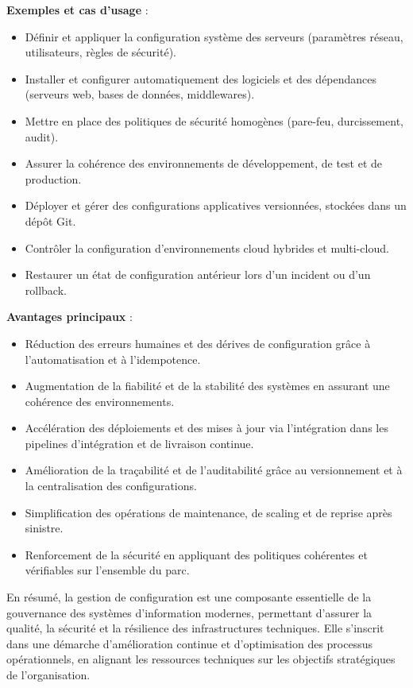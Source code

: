 \textbf{Exemples et cas d’usage} :
\begin{itemize}
	\item Définir et appliquer la configuration système des serveurs (paramètres réseau, utilisateurs, règles de sécurité).
	\item Installer et configurer automatiquement des logiciels et des dépendances (serveurs web, bases de données, middlewares).
	\item Mettre en place des politiques de sécurité homogènes (pare-feu, durcissement, audit).
	\item Assurer la cohérence des environnements de développement, de test et de production.
	\item Déployer et gérer des configurations applicatives versionnées, stockées dans un dépôt Git.
	\item Contrôler la configuration d’environnements cloud hybrides et multi-cloud.
	\item Restaurer un état de configuration antérieur lors d’un incident ou d’un rollback.
\end{itemize}

\textbf{Avantages principaux} :
\begin{itemize}
	\item Réduction des erreurs humaines et des dérives de configuration grâce à l’automatisation et à l’idempotence.
	\item Augmentation de la fiabilité et de la stabilité des systèmes en assurant une cohérence des environnements.
	\item Accélération des déploiements et des mises à jour via l’intégration dans les pipelines d’intégration et de livraison continue.
	\item Amélioration de la traçabilité et de l’auditabilité grâce au versionnement et à la centralisation des configurations.
	\item Simplification des opérations de maintenance, de scaling et de reprise après sinistre.
	\item Renforcement de la sécurité en appliquant des politiques cohérentes et vérifiables sur l’ensemble du parc.
\end{itemize}

En résumé, la gestion de configuration est une composante essentielle de la gouvernance des systèmes d’information modernes, permettant d’assurer la qualité, la sécurité et la résilience des infrastructures techniques. Elle s’inscrit dans une démarche d’amélioration continue et d’optimisation des processus opérationnels, en alignant les ressources techniques sur les objectifs stratégiques de l’organisation.

